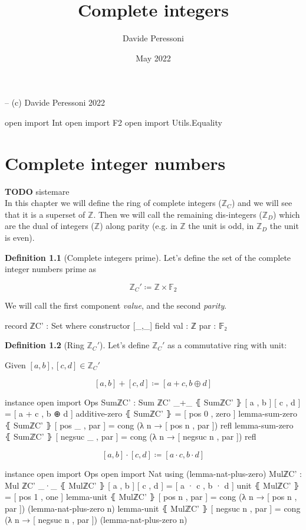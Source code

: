 \documentclass[a4paper]{report}
\title{Complete integers}
\author{Davide Peressoni}
\date{May 2022}
\theoremstyle{definition}
\newtheorem{definition}{Definition}
\newcommand\bZ{\mathbb{Z}}
\newcommand\bF{\mathbb{F}}
\begin{document}
\maketitle

\begin{code}
-- (c) Davide Peressoni 2022

open import Int
open import F2
open import Utils.Equality
\end{code}

\chapter{Complete integer numbers}

\textbf{TODO} sistemare\\
In this chapter we will define the ring of complete integers ($\bZ_C$) and we will
see that it is a superset of $\bZ$. Then we will call the remaining dis-integers
($\bZ_D$) which are the dual of integers ($\bZ$) along parity (e.g. in $\bZ$ the unit is
odd, in $\bZ_D$ the unit is even).

\begin{definition}[Complete integers prime]
Let's define the set of the complete integer numbers prime as

\[\bZ_C' \coloneqq \bZ\times\bF_2\]

We will call the first component \emph{value}, and the second \emph{parity}.

\begin{code}
record ℤC' : Set where
  constructor [_,_]
  field
    val : ℤ
    par : 𝔽₂
\end{code}
\end{definition}

\begin{definition}[Ring $\bZ_C'$]
Let's define $\bZ_C'$ as a commutative ring with unit:

Given $[a,b], [c,d] \in \bZ_C'$

\[[a,b] + [c,d] \coloneqq [a+c, b\oplus d]\]

\begin{code}
instance
  open import Ops
  SumℤC' : Sum ℤC'
  _+_ ⦃ SumℤC' ⦄ [ a , b ] [ c , d ] = [ a + c , b ⊕ d ]
  additive-zero ⦃ SumℤC' ⦄ = [ pos 0 , zero ]
  lemma-sum-zero ⦃ SumℤC' ⦄ [ pos _    , par ] = cong (λ n → [ pos n , par ]) refl
  lemma-sum-zero ⦃ SumℤC' ⦄ [ negsuc _ , par ] = cong (λ n → [ negsuc n , par ]) refl
\end{code}

\[[a,b] \cdot [c,d] \coloneqq [a\cdot c, b\cdot d]\]

\begin{code}
instance
  open import Ops
  open import Nat using (lemma-nat-plus-zero)
  MulℤC' : Mul ℤC'
  _·_ ⦃ MulℤC' ⦄ [ a , b ] [ c , d ] = [ a · c , b · d ]
  unit ⦃ MulℤC' ⦄ = [ pos 1 , one ]
  lemma-unit ⦃ MulℤC' ⦄ [ pos n    , par ] = cong (λ n → [ pos n , par ]) (lemma-nat-plus-zero n)
  lemma-unit ⦃ MulℤC' ⦄ [ negsuc n , par ] = cong (λ n → [ negsuc n , par ]) (lemma-nat-plus-zero n)
\end{code}
\end{definition}
\end{document}
